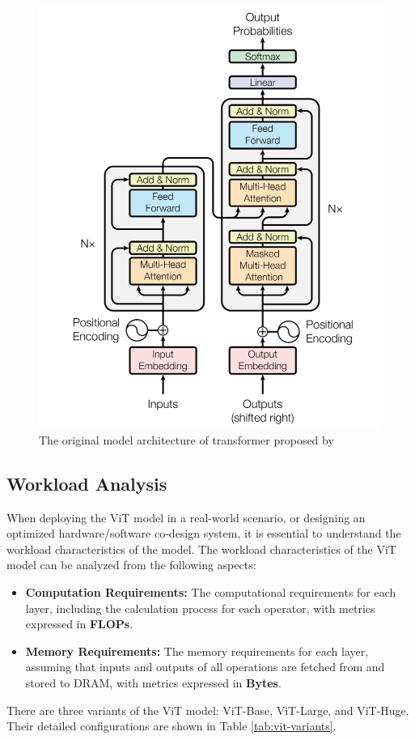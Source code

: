 \documentclass[12pt]{article}
\begin{document}
\begin{figure}
    \centering
    \includegraphics[width=0.5\linewidth]{images/model_arch_orig.png}
    \caption{The original model architecture of transformer proposed by \cite{vaswani_attention_2023}}
    \label{fig:model_arch_orig}
\end{figure}


\subsection{Workload Analysis}

When deploying the ViT model in a real-world scenario, or designing an optimized hardware/software co-design system, it is essential to understand the workload characteristics of the model. The workload characteristics of the ViT model can be analyzed from the following aspects:

\begin{itemize}
    \item \textbf{Computation Requirements:} The computational requirements for each layer, including the calculation process for each operator, with metrics expressed in \textbf{FLOPs}.
    \item \textbf{Memory Requirements:} The memory requirements for each layer, assuming that inputs and outputs of all operations are fetched from and stored to DRAM, with metrics expressed in \textbf{Bytes}.
\end{itemize}

There are three variants of the ViT model: ViT-Base, ViT-Large, and ViT-Huge. Their detailed configurations are shown in Table \ref{tab:vit-variants}.
\end{document}
